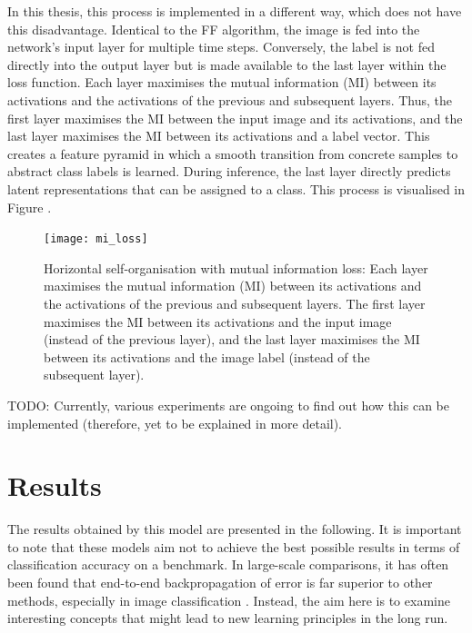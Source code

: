 In this thesis, this process is implemented in a different way, which does not have this disadvantage. Identical to the FF algorithm, the image is fed into the network's input layer for multiple time steps. Conversely, the label is not fed directly into the output layer but is made available to the last layer within the loss function. Each layer maximises the mutual information (MI) between its activations and the activations of the previous and subsequent layers. Thus, the first layer maximises the MI between the input image and its activations, and the last layer maximises the MI between its activations and a label vector. This creates a feature pyramid in which a smooth transition from concrete samples to abstract class labels is learned. During inference, the last layer directly predicts latent representations that can be assigned to a class. This process is visualised in Figure . 

\begin{figure}[h]
    \centering
    \texttt{[image: mi\_loss]}
    \caption[Horizontal self-organisation with mutual information loss]{Horizontal self-organisation with mutual information loss: Each layer maximises the mutual information (MI) between its activations and the activations of the previous and subsequent layers. The first layer maximises the MI between its activations and the input image (instead of the previous layer), and the last layer maximises the MI between its activations and the image label (instead of the subsequent layer).}
\end{figure}




TODO: Currently, various experiments are ongoing to find out how this can be implemented (therefore, yet to be explained in more detail).




\section{Results}
The results obtained by this model are presented in the following. It is important to note that these models aim not to achieve the best possible results in terms of classification accuracy on a benchmark. In large-scale comparisons, it has often been found that end-to-end backpropagation of error is far superior to other methods, especially in image classification . Instead, the aim here is to examine interesting concepts that might lead to new learning principles in the long run.

